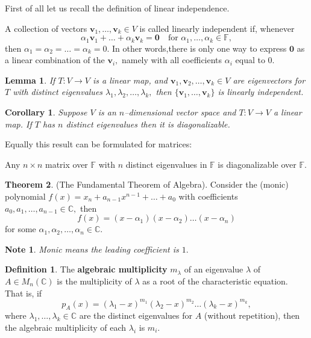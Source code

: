 \documentclass[12pt, a4paper]{article}
\newcommand{\bb}[1]{\mathbb{#1}}
\newtheorem*{note}{Note}
\theoremstyle{definition}
\newtheorem{definition}{Definition}[section]
\newtheorem{theorem}{Theorem}[section]
\theoremstyle{plain}
\newtheorem{corollary}{Corollary}[theorem]
\newtheorem{lemma}[theorem]{Lemma}
\begin{document}
First of all let us recall the definition of linear independence.

\begin{tcolorbox}
A collection of vectors $\mathbf{v}_1,\ldots, \mathbf{v}_k \in V$ is called linearly independent if, whenever $$\alpha_1\mathbf{v}_1 +\ldots+\alpha_k\mathbf{v}_k = \mathbf{0} \quad \text{for } \alpha_1,\ldots,\alpha_k \in \bb{F},$$ then $\alpha_1 =\alpha_2 =\ldots=\alpha_k =0.$ In other words,there is only one way to express $\mathbf{0}$ as a linear combination of the $\mathbf{v}_i,$ namely with all coefficients $\alpha_i$ equal to $0.$
\end{tcolorbox}

\begin{lemma}
If $T : V \to V$ is a linear map, and $\mathbf{v}_1,\mathbf{v}_2,\ldots,\mathbf{v}_k \in V$ are eigenvectors for $T$ with distinct eigenvalues $\lambda_1, \lambda_2,\ldots, \lambda_k,$ then $\{\mathbf{v}_1,\ldots,\mathbf{v}_k\}$ is linearly independent.
\end{lemma}

\begin{corollary}
Suppose $V$ is an $n$--dimensional vector space and $T : V \to V$ a linear map. If $T$ has $n$ distinct eigenvalues then it is diagonalizable.
\end{corollary}

Equally this result can be formulated for matrices:

\begin{tcolorbox}
Any $n\times n$ matrix over $\bb{F}$ with $n$ distinct eigenvalues in $\bb{F}$ is diagonalizable over $\bb{F}.$
\end{tcolorbox}

\begin{theorem}
(The Fundamental Theorem of Algebra). Consider the (monic) polynomial $f(x)=x_n+a_{n-1}x^{n-1}+\ldots+a_0$ with coefficients $a_0,a_1,\ldots,a_{n-1} \in \bb{C},$ then
$$f(x) = (x - \alpha_1)(x - \alpha_2)\ldots(x -\alpha_n)$$ for some $\alpha_1,\alpha_2,\ldots,\alpha_n \in \bb{C}.$
\end{theorem}

\begin{note}
Monic means the leading coefficient is $1.$
\end{note}

\begin{definition}
The \textbf{algebraic multiplicity} $m_\lambda$ of an eigenvalue $\lambda$ of $A \in M_n(\bb{C})$ is the multiplicity of $\lambda$ as a root of the characteristic equation. That is, if $$p_A(x)=(\lambda_1 -x)^{m_1}(\lambda_2 -x)^{m_2}\ldots(\lambda_k -x)^{m_k},$$
where $\lambda_1,\ldots, \lambda_k \in \bb{C}$ are the distinct eigenvalues for $A$ (without repetition), then the algebraic multiplicity of each $\lambda_i$ is $m_i.$
\end{definition}
\end{document}
